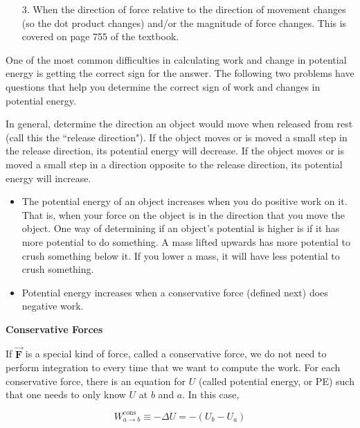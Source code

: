 \documentclass{article}
\newcommand{\bfvec}[1]{\vec{\mathbf{#1}}}
\begin{document}
\begin{enumerate}

  \item[3.] When the direction of force relative to the direction of movement changes (so the dot product changes) and/or the magnitude of force changes. This is covered on page 755 of the textbook.

\end{enumerate}

One of the most common difficulties in calculating work and change in potential energy is getting the correct sign for the answer. The following two problems have questions that help you determine the correct sign of work and changes in potential energy.

In general, determine the direction an object would move when released from rest (call this the ``release direction"). If the object moves or is moved a small step in the release direction, its potential energy will decrease. If the object moves or is moved a small step in a direction opposite to the release direction, its potential energy will increase.

\begin{itemize}

  \item The potential energy of an object increases when you do positive work on it. That is, when your force on the object is in the direction that you move the object. One way of determining if an object's potential is higher is if it has more potential to do something. A mass lifted upwards has more potential to crush something below it. If you lower a mass, it will have less potential to crush something.

  \item Potential energy increases when a conservative force (defined next) does negative work.

\end{itemize}

\textbf{Conservative Forces}

If $\bfvec{F}$ is a special kind of force, called a conservative force, we do not need to perform integration to every time that we want to compute the work. For each conservative force, there is an equation for $U$ (called potential energy, or PE) such that one needs to only know $U$ at $b$ and $a$. In this case,

\begin{equation}
W_{a\rightarrow b}^{
\text{cons}} \equiv -\Delta U = -(U_b-U_a)
\end{equation}
\end{document}
